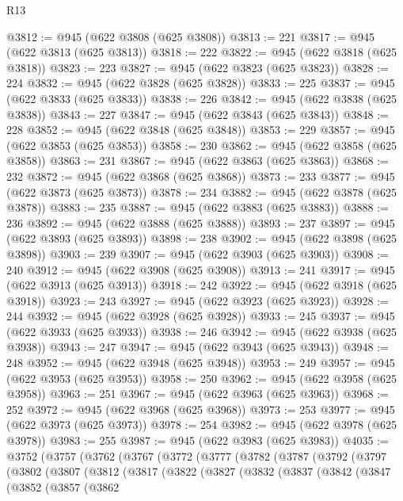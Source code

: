 \begin{lexlean}{R13}
\begin{coremodule}
@3812 := @945 (@622 @3808 (@625 @3808))
@3813 := 221
@3817 := @945 (@622 @3813 (@625 @3813))
@3818 := 222
@3822 := @945 (@622 @3818 (@625 @3818))
@3823 := 223
@3827 := @945 (@622 @3823 (@625 @3823))
@3828 := 224
@3832 := @945 (@622 @3828 (@625 @3828))
@3833 := 225
@3837 := @945 (@622 @3833 (@625 @3833))
@3838 := 226
@3842 := @945 (@622 @3838 (@625 @3838))
@3843 := 227
@3847 := @945 (@622 @3843 (@625 @3843))
@3848 := 228
@3852 := @945 (@622 @3848 (@625 @3848))
@3853 := 229
@3857 := @945 (@622 @3853 (@625 @3853))
@3858 := 230
@3862 := @945 (@622 @3858 (@625 @3858))
@3863 := 231
@3867 := @945 (@622 @3863 (@625 @3863))
@3868 := 232
@3872 := @945 (@622 @3868 (@625 @3868))
@3873 := 233
@3877 := @945 (@622 @3873 (@625 @3873))
@3878 := 234
@3882 := @945 (@622 @3878 (@625 @3878))
@3883 := 235
@3887 := @945 (@622 @3883 (@625 @3883))
@3888 := 236
@3892 := @945 (@622 @3888 (@625 @3888))
@3893 := 237
@3897 := @945 (@622 @3893 (@625 @3893))
@3898 := 238
@3902 := @945 (@622 @3898 (@625 @3898))
@3903 := 239
@3907 := @945 (@622 @3903 (@625 @3903))
@3908 := 240
@3912 := @945 (@622 @3908 (@625 @3908))
@3913 := 241
@3917 := @945 (@622 @3913 (@625 @3913))
@3918 := 242
@3922 := @945 (@622 @3918 (@625 @3918))
@3923 := 243
@3927 := @945 (@622 @3923 (@625 @3923))
@3928 := 244
@3932 := @945 (@622 @3928 (@625 @3928))
@3933 := 245
@3937 := @945 (@622 @3933 (@625 @3933))
@3938 := 246
@3942 := @945 (@622 @3938 (@625 @3938))
@3943 := 247
@3947 := @945 (@622 @3943 (@625 @3943))
@3948 := 248
@3952 := @945 (@622 @3948 (@625 @3948))
@3953 := 249
@3957 := @945 (@622 @3953 (@625 @3953))
@3958 := 250
@3962 := @945 (@622 @3958 (@625 @3958))
@3963 := 251
@3967 := @945 (@622 @3963 (@625 @3963))
@3968 := 252
@3972 := @945 (@622 @3968 (@625 @3968))
@3973 := 253
@3977 := @945 (@622 @3973 (@625 @3973))
@3978 := 254
@3982 := @945 (@622 @3978 (@625 @3978))
@3983 := 255
@3987 := @945 (@622 @3983 (@625 @3983))
@4035 := @3752
    (@3757
      (@3762
        (@3767
          (@3772
            (@3777
              (@3782
                (@3787
                  (@3792
                    (@3797
                      (@3802
                        (@3807
                          (@3812
                            (@3817
                              (@3822
                                (@3827
                                  (@3832
                                    (@3837
                                      (@3842
                                        (@3847
                                          (@3852
                                            (@3857
                                              (@3862

\end{coremodule}
\end{lexlean}

